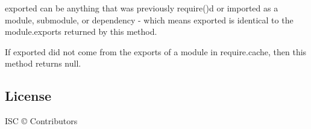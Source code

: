 {\ttfamily exported} can be anything that was previously {\ttfamily require()}d or {\ttfamily import}ed as a module, submodule, or dependency -\/ which means {\ttfamily exported} is identical to the {\ttfamily module.\+exports} returned by this method.

If {\ttfamily exported} did not come from the {\ttfamily exports} of a {\ttfamily module} in {\ttfamily require.\+cache}, then this method returns {\ttfamily null}.

\subsection*{License}

I\+SC © Contributors 